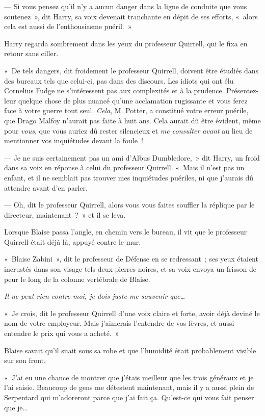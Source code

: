 --- Si vous pensez qu'il n'y a aucun danger dans la ligne de conduite que vous soutenez~», dit Harry, sa voix devenait tranchante en dépit de ses efforts, «~alors cela est aussi de l'enthousiasme puéril.~»

Harry regarda sombrement dans les yeux du professeur Quirrell, qui le fixa en retour sans ciller.

«~De tels dangers, dit froidement le professeur Quirrell, doivent être étudiés dans des bureaux tels que celui-ci, pas dans des discours.
Les idiots qui ont élu Cornelius Fudge ne s'intéressent pas aux complexités et à la prudence.
Présentez-leur quelque chose de plus nuancé qu'une acclamation rugissante et vous ferez face à votre guerre tout seul.
\emph{Cela}, M. Potter, a constitué votre erreur puérile, que Drago Malfoy n'aurait pas faite à huit ans.
Cela aurait dû être évident, même pour \emph{vous}, que vous auriez dû rester silencieux et \emph{me consulter avant} au lieu de mentionner vos inquiétudes devant la foule~!

--- Je ne suis certainement pas un ami d'Albus Dumbledore,~» dit Harry, un froid dans sa voix en réponse à celui du professeur Quirrell.
«~Mais il n'est pas un enfant, et il ne semblait pas trouver mes inquiétudes puériles, ni que j'aurais dû attendre avant d'en parler.

--- Oh, dit le professeur Quirrell, alors vous vous faites souffler la réplique par le directeur, maintenant~?~»
et il se leva.

\later

Lorsque Blaise passa l'angle, en chemin vers le bureau, il vit que le professeur Quirrell était déjà là, appuyé contre le mur.

«~Blaise Zabini~», dit le professeur de Défense en se redressant~; ses yeux étaient incrustés dans son visage tels deux pierres noires, et sa voix envoya un frisson de peur le long de la colonne vertébrale de Blaise.

\emph{Il ne peut rien contre moi, je dois juste me souvenir que…}

«~Je crois, dit le professeur Quirrell d'une voix claire et forte, avoir déjà deviné le nom de votre employeur.
Mais j'aimerais l'entendre de vos lèvres, et aussi entendre le prix qui vous a acheté.~»

Blaise savait qu'il suait sous sa robe et que l'humidité était probablement visible sur son front.

«~J'ai eu une chance de montrer que j'étais meilleur que les trois généraux et je l'ai saisie.
Beaucoup de gens me détestent maintenant, mais il y a aussi plein de Serpentard qui m'adoreront parce que j'ai fait ça.
Qu'est-ce qui vous fait penser que je…

